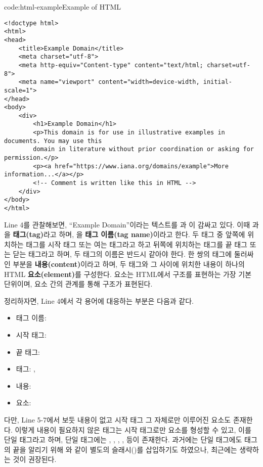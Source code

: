 \begin{codeenv}{code:html-example}{Example of HTML}\begin{verbatim}
<!doctype html>
<html>
<head>
    <title>Example Domain</title>
    <meta charset="utf-8">
    <meta http-equiv="Content-type" content="text/html; charset=utf-8">
    <meta name="viewport" content="width=device-width, initial-scale=1">
</head>
<body>
    <div>
        <h1>Example Domain</h1>
        <p>This domain is for use in illustrative examples in documents. You may use this
        domain in literature without prior coordination or asking for permission.</p>
        <p><a href="https://www.iana.org/domains/example">More information...</a></p>
        <!-- Comment is written like this in HTML -->
    </div>
</body>
</html>
\end{verbatim}
\end{codeenv}

Line 4를 관찰해보면, ``Example Domain''이라는 텍스트를 과 이 감싸고 있다. 이때 과 을 \textbf{태그(tag)}라고 하며, 을 \textbf{태그 이름(tag name)}이라고 한다. 두 태그 중 앞쪽에 위치하는 태그를 시작 태그 또는 여는 태그라고 하고 뒤쪽에 위치하는 태그를 끝 태그 또는 닫는 태그라고 하며, 두 태그의 이름은 반드시 같아야 한다. 한 쌍의 태그에 둘러싸인 부분을 \textbf{내용(content)}이라고 하며, 두 태그와 그 사이에 위치한 내용이 하나의 HTML \textbf{요소(element)}를 구성한다. 요소는 HTML에서 구조를 표현하는 가장 기본 단위이며, 요소 간의 관계를 통해 구조가 표현된다.

정리하자면, Line 4에서 각 용어에 대응하는 부분은 다음과 같다.

\begin{itemize}
    \item 태그 이름: 
    \item 시작 태그: 
    \item 끝 태그: 
    \item 태그: , 
    \item 내용: 
    \item 요소: 
\end{itemize}

다만, Line 5-7에서 보듯 내용이 없고 시작 태그 그 자체로만 이루어진 요소도 존재한다. 이렇게 내용이 필요하지 않은 태그는 시작 태그로만 요소를 형성할 수 있고, 이를 단일 태그라고 하며, 단일 태그에는 , , , ,  등이 존재한다. 과거에는 단일 태그에도 태그의 끝을 알리기 위해 와 같이 별도의 슬래시(\cd{/})를 삽입하기도 하였으나, 최근에는 생략하는 것이 권장된다.


